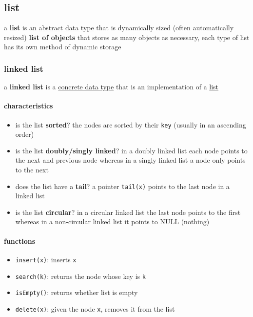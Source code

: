 \documentclass[a4paper,12pt]{article}
\begin{document}
\subsection{list}
\label{sec:org250337b}
\begin{definition}
a \textbf{list} is an \hyperref[sec:orga3b31cf]{abstract data type} that is dynamically sized (often automatically resized) \textbf{list of objects} that stores as many objects as necessary, each type of list has its own method of dynamic storage\\[0pt]
\end{definition}
\subsubsection{linked list}
\label{sec:org3b67cf5}
\begin{definition}
a \textbf{linked list} is a \hyperref[sec:org39a1299]{concrete data type} that is an implementation of a \hyperref[sec:org250337b]{list}\\[0pt]
\end{definition}
\paragraph{characteristics}
\label{sec:org55250f7}
\begin{itemize}
\item is the list \textbf{sorted}? the nodes are sorted by their \texttt{key} (usually in an ascending order)\\[0pt]
\item is the list \textbf{doubly/singly linked}? in a doubly linked list each node points to the next and previous node whereas in a singly linked list a node only points to the next\\[0pt]
\item does the list have a \textbf{tail}? a pointer \texttt{tail(x)} points to the last node in a linked list\\[0pt]
\item is the list \textbf{circular}? in a circular linked list the last node points to the first whereas in a non-circular linked list it points to NULL (nothing)\\[0pt]
\end{itemize}
\paragraph{functions}
\label{sec:org756421d}
\begin{itemize}
\item \texttt{insert(x)}: inserts \texttt{x}\\[0pt]
\item \texttt{search(k)}: returns the node whose key is \texttt{k}\\[0pt]
\item \texttt{isEmpty()}: returns whether list is empty\\[0pt]
\item \texttt{delete(x)}: given the node \texttt{x}, removes it from the list\\[0pt]
\end{itemize}
\end{document}
